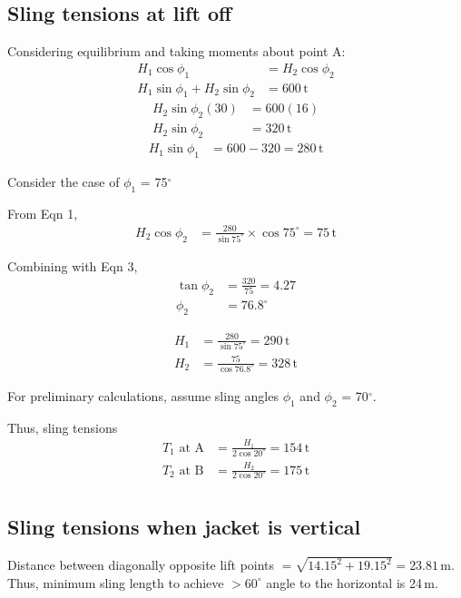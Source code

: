 \documentclass[a4paper,10pt]{article}
\renewcommand{\deg}{$^\circ$}
\begin{document}
\subsection*{Sling tensions at lift off}
Considering equilibrium and taking moments about point A:
\begin{align}
H_1 \cos{\phi_1} &= H_2 \cos{\phi_2} \\
H_1 \sin{\phi_1} + H_2 \sin{\phi_2} &= 600\,\mathrm{t}
\end{align}
\begin{align}
H_2 \sin{\phi_2} (30) &= 600 (16) \\ \nonumber
H_2 \sin{\phi_2} &= 320\,\mathrm{t}
\end{align}
\begin{align*}
H_1 \sin{\phi_1} &= 600 - 320 = 280\,\mathrm{t}
\end{align*}

Consider the case of $\phi_1$ = 75\deg\,

From Eqn 1, 
\begin{align*}
H_2 \cos{\phi_2} &= \frac{280}{\sin{75^\circ}} \times \cos{75^\circ} 
                  = 75\,\mathrm{t}
\end{align*}

Combining with Eqn 3,
\begin{align*}
\tan{\phi_2} &= \frac{320}{75} = 4.27 \\
\phi_2 &= 76.8^\circ
\end{align*}

\begin{align*}
H_1 &= \frac{280}{\sin{75^\circ}} = 290\,\mathrm{t} \\
H_2 &= \frac{75}{\cos{76.8^\circ}} = 328\,\mathrm{t}
\end{align*}

For preliminary calculations, assume sling angles 
$\phi_1$ and $\phi_2$ = 70\deg. 

Thus, sling tensions
\begin{align*}
T_1 \text{ at A} &= \frac{H_1}{2 \cos{20^\circ}} = 154\,\mathrm{t} \\
T_2 \text{ at B} &= \frac{H_2}{2 \cos{20^\circ}} = 175\,\mathrm{t} \\
\end{align*}

\subsection*{Sling tensions when jacket is vertical}
Distance between diagonally opposite lift points 
$= \sqrt{14.15^2 +19.15^2} = 23.81\,\mathrm{m}$.
Thus, minimum sling length to achieve $>60^\circ$ angle to the 
horizontal is 24\,m.
\end{document}
